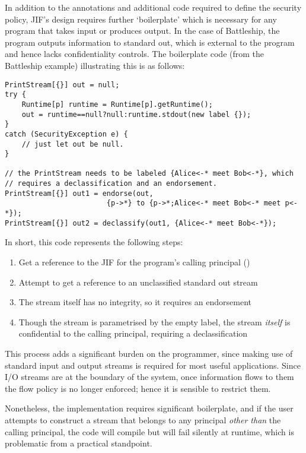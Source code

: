 In addition to the annotations and additional code required to define the security policy, JIF's design requires further `boilerplate' which is necessary for any program that takes input or produces output. In the case of Battleship, the program outputs information to standard out, which is external to the program and hence lacks confidentiality controls. The boilerplate code (from the Battleship example) illustrating this is as follows:

\begin{verbatim}
PrintStream[{}] out = null;
try {
	Runtime[p] runtime = Runtime[p].getRuntime();
	out = runtime==null?null:runtime.stdout(new label {});
}
catch (SecurityException e) {
	// just let out be null.
}

// the PrintStream needs to be labeled {Alice<-* meet Bob<-*}, which
// requires a declassification and an endorsement.
PrintStream[{}] out1 = endorse(out, 
		   				{p->*} to {p->*;Alice<-* meet Bob<-* meet p<-*});
PrintStream[{}] out2 = declassify(out1, {Alice<-* meet Bob<-*});
\end{verbatim}

In short, this code represents the following steps:

\begin{enumerate}
	\item Get a reference to the JIF  for the program's calling principal ()
	
	\item Attempt to get a reference to an unclassified standard out stream
	
	\item The stream itself has no integrity, so it requires an endorsement
	
	\item Though the stream is parametrised by the empty label, the stream \textit{itself} is confidential to the calling principal, requiring a declassification
\end{enumerate}

This process adds a significant burden on the programmer, since making use of standard input and output streams is required for most useful applications. Since I/O streams are at the boundary of the system, once information flows to them the flow policy is no longer enforced; hence it is sensible to restrict them.

Nonetheless, the implementation requires significant boilerplate, and if the user attempts to construct a stream that belongs to any principal \textit{other than} the calling principal, the code will compile but will fail silently at runtime, which is problematic from a practical standpoint.

